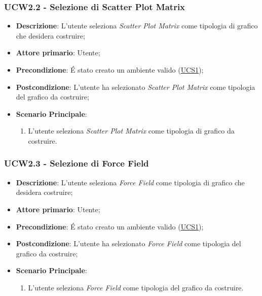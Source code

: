 \subsubsection{UCW2.2 - Selezione di Scatter Plot Matrix}
\label{ssub:ucw2.2}
\begin{itemize}

	\item \textbf{Descrizione}: L’utente seleziona \emph{Scatter Plot Matrix} come tipologia di grafico che desidera 
	costruire;

    \item \textbf{Attore primario}: Utente;

	\item \textbf{Precondizione}:   É stato creato un ambiente valido (\hyperref[sub:ucs1]{UCS1});

	\item \textbf{Postcondizione}:  L'utente ha selezionato \emph{Scatter Plot Matrix} come tipologia del grafico da 
	costruire;

	\item \textbf{Scenario Principale}:
	\begin{enumerate}
		\item L'utente seleziona \emph{Scatter Plot Matrix} come tipologia di grafico da costruire.
	\end{enumerate}
\end{itemize}


\subsubsection{UCW2.3 - Selezione di Force Field}
\label{ssub:ucw2.3}
\begin{itemize}

	\item \textbf{Descrizione}: L’utente seleziona \emph{Force Field} come tipologia di grafico che desidera 
	costruire;

    \item \textbf{Attore primario}: Utente;

    \item \textbf{Precondizione}:   É stato creato un ambiente valido (\hyperref[sub:ucs1]{UCS1});

    \item \textbf{Postcondizione}:  L'utente ha selezionato \emph{Force Field} come tipologia del grafico da 
	costruire;
	
	\item \textbf{Scenario Principale}: 
	\begin{enumerate}
		\item L'utente seleziona \emph{Force Field} come tipologia del grafico da costruire.
	\end{enumerate}

\end{itemize}


